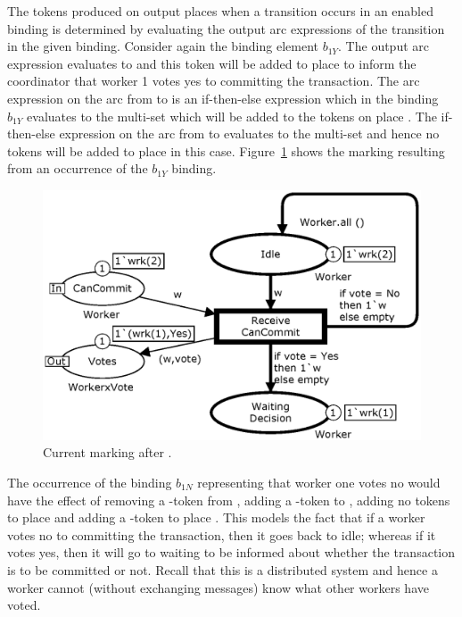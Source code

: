 
The tokens produced on output places when a transition occurs in an
enabled binding is determined by evaluating the output arc expressions
of the transition in the given binding. Consider again the binding
element $b_{1Y}$. The output arc expression 
evaluates to  and this token will be added to
place  to inform the coordinator that worker 1 votes
yes to committing the transaction. The arc expression on the arc from
 to  is an
if-then-else expression which in the binding $b_{1Y}$ evaluates to the
multi-set  which will be added to the tokens on
place . The if-then-else expression on the
arc from  to  evaluates to the
 multi-set and hence no tokens will be added to place
 in this case. Figure~\ref{fig:receivecancommit} shows
the marking resulting from an occurrence of the $b_{1Y}$ binding.

\begin{figure}[b]
\centering
\includegraphics[scale=.45]{figures/ReceiveCanCommit.eps}
\caption{Current marking after .}
\label{fig:receivecancommit}
\end{figure}

The occurrence of the binding $b_{1N}$ representing that worker one
votes no would have the effect of removing a -token
from , adding a -token to
, adding no tokens to place 
and adding a -token to place . This
models the fact that if a worker votes no to committing the
transaction, then it goes back to idle; whereas if it votes yes, then
it will go to waiting to be informed about whether the transaction is
to be committed or not.  Recall that this is a distributed system and
hence a worker cannot (without exchanging messages) know what other
workers have voted. 

